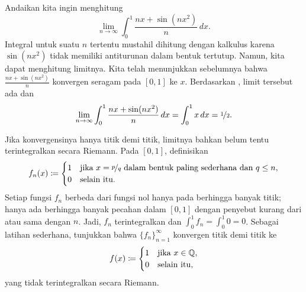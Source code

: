 \begin{example}
Andaikan kita ingin menghitung
\begin{equation*}
\lim_{n\to\infty} \int_0^1 \frac{nx+ \sin(nx^2)}{n} \,dx .
\end{equation*}
Integral untuk suatu $n$ tertentu mustahil dihitung dengan
kalkulus karena $\sin(nx^2)$ tidak memiliki antiturunan dalam bentuk tertutup.  Namun,
kita dapat menghitung limitnya.
Kita telah menunjukkan sebelumnya bahwa $\frac{nx+ \sin(nx^2)}{n}$ konvergen seragam
pada $[0,1]$ ke $x$.
Berdasarkan , limit tersebut ada dan
\begin{equation*}
\lim_{n\to\infty} \int_0^1 \frac{nx+ \sin(nx^2)}{n} \,dx
=
\int_0^1
x \,dx = \nicefrac{1}{2} .
\end{equation*}
\end{example}

\begin{example}
Jika konvergensinya hanya titik demi titik, limitnya bahkan belum tentu terintegralkan secara
Riemann.  Pada $[0,1]$, definisikan
\begin{equation*}
f_n(x) \coloneqq
\begin{cases}
1 & \text{jika } x = \nicefrac{p}{q} \text{ dalam bentuk paling sederhana dan } q \leq n, \\
0 & \text{selain itu.}
\end{cases}
\end{equation*}
Setiap fungsi $f_n$ berbeda dari fungsi nol hanya pada berhingga banyak titik;
hanya ada berhingga banyak pecahan dalam $[0,1]$ dengan penyebut kurang dari
atau sama dengan $n$.   Jadi, $f_n$ terintegralkan dan $\int_0^1 f_n = \int_0^1 0 =
0$.  Sebagai latihan sederhana, tunjukkan bahwa $\{ f_n \}_{n=1}^\infty$ konvergen titik demi titik ke
\begin{equation*}
f(x) \coloneqq
\begin{cases}
1 & \text{jika } x \in {\mathbb{Q}}, \\
0 & \text{selain itu,}
\end{cases}
\end{equation*}
yang tidak terintegralkan secara Riemann.
\end{example}

